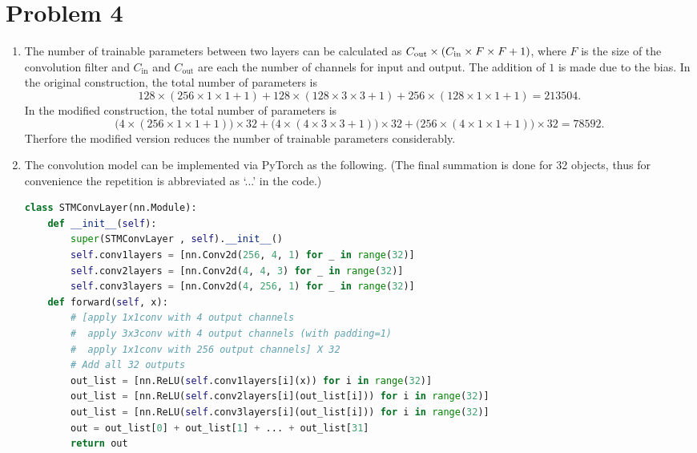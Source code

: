 \documentclass[10pt]{article}
\begin{document}
\section*{Problem 4}
\begin{enumerate}[(1), leftmargin=*]
    \item The number of trainable parameters between two layers can be calculated as $C_{\mathrm{out}} \times \qty(C_{\mathrm{in}} \times F \times F + 1)$, where $F$ is the size of the convolution filter and $C_{\mathrm{in}}$ and $C_{\mathrm{out}}$ are each the number of channels for input and output.
    The addition of $1$ is made due to the bias.
    In the original construction, the total number of parameters is
    $$128 \times (256 \times 1 \times 1 + 1) + 128 \times (128 \times 3 \times 3 + 1) + 256 \times (128 \times 1 \times 1 + 1) = 213504.$$
    In the modified construction, the total number of parameters is
    $$\Big(4 \times (256 \times 1 \times 1 + 1)\Big) \times 32 + \Big(4 \times (4 \times 3 \times 3 + 1)\Big) \times 32 + \Big(256 \times (4 \times 1 \times 1 + 1)\Big) \times 32 = 78592.$$
    Therfore the modified version reduces the number of trainable parameters considerably.
    \item The convolution model can be implemented via PyTorch as the following.
    (The final summation is done for 32 objects, thus for convenience the repetition is abbreviated as `...' in the code.)
    \begin{lstlisting}[language=Python]
class STMConvLayer(nn.Module):
    def __init__(self):
        super(STMConvLayer , self).__init__()
        self.conv1layers = [nn.Conv2d(256, 4, 1) for _ in range(32)]
        self.conv2layers = [nn.Conv2d(4, 4, 3) for _ in range(32)]
        self.conv3layers = [nn.Conv2d(4, 256, 1) for _ in range(32)]
    def forward(self, x):
        # [apply 1x1conv with 4 output channels
        #  apply 3x3conv with 4 output channels (with padding=1)
        #  apply 1x1conv with 256 output channels] X 32
        # Add all 32 outputs
        out_list = [nn.ReLU(self.conv1layers[i](x)) for i in range(32)]
        out_list = [nn.ReLU(self.conv2layers[i](out_list[i])) for i in range(32)]
        out_list = [nn.ReLU(self.conv3layers[i](out_list[i])) for i in range(32)]
        out = out_list[0] + out_list[1] + ... + out_list[31]
        return out
    \end{lstlisting}
\end{enumerate}
\end{document}
